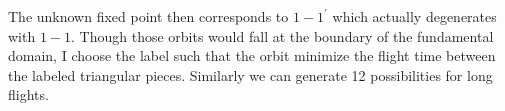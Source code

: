 \begin{description}
The unknown fixed point then corresponds to $1-1^\prime$ which actually degenerates with $1-1$. Though those orbits would fall at the boundary of the fundamental domain, I choose the label such that the orbit minimize the flight time between the labeled triangular pieces. Similarly we can generate 12 possibilities for long flights.

\end{description}

